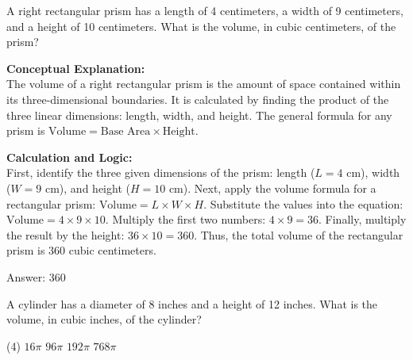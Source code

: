 \documentclass[11pt,paper=a4,answers]{exam}
\begin{document}
\begin{questions}
\pointsinrightmargin
\pointsdroppedatright
\marksnotpoints
{}
\pointformat{\boldmath\themarginpoints}
\bracketedpoints



\question
A right rectangular prism has a length of 4 centimeters, a width of 9 centimeters, and a height of 10 centimeters. What is the volume, in cubic centimeters, of the prism?

\begin{solution}
\textbf{Conceptual Explanation:} \\
The volume of a right rectangular prism is the amount of space contained within its three-dimensional boundaries. It is calculated by finding the product of the three linear dimensions: length, width, and height. The general formula for any prism is $\text{Volume} = \text{Base Area} \times \text{Height}$.

\vspace{30pt}

\textbf{Calculation and Logic:} \\
First, identify the three given dimensions of the prism: length ($L = 4$ cm), width ($W = 9$ cm), and height ($H = 10$ cm). Next, apply the volume formula for a rectangular prism: $\text{Volume} = L \times W \times H$. Substitute the values into the equation: $\text{Volume} = 4 \times 9 \times 10$. Multiply the first two numbers: $4 \times 9 = 36$. Finally, multiply the result by the height: $36 \times 10 = 360$. Thus, the total volume of the rectangular prism is 360 cubic centimeters.

\vspace{30pt}

Answer: \colorbox{yellow!100}{360}
\end{solution}

\vspace{60pt}

\question
A cylinder has a diameter of 8 inches and a height of 12 inches. What is the volume, in cubic inches, of the cylinder?
\begin{tasks}(4)
    \task $16\pi$
    \task $96\pi$
    \task $192\pi$
    \task $768\pi$
\end{tasks}


\end{questions}
\end{document}
